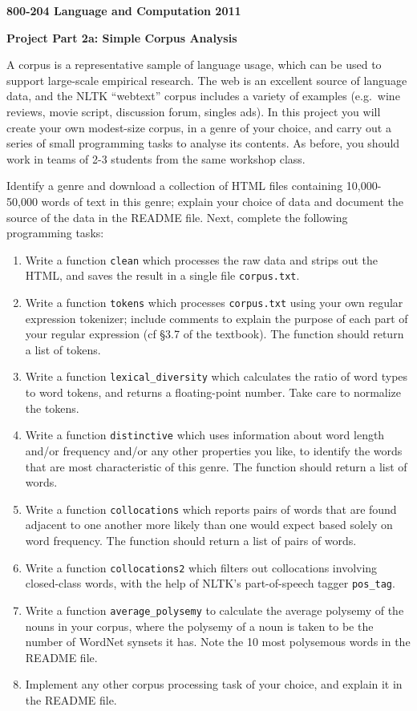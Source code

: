 \documentclass[a4paper,11pt]{article}
\begin{document}
\centerline{\LARGE\bf 800-204 Language and Computation 2011}\vspace{2ex}

\centerline{\large\bf Project Part 2a: Simple Corpus Analysis}\vspace{1ex}

A corpus is a representative sample of language usage, which can be
used to support large-scale empirical research.  The web is an
excellent source of language data, and the NLTK ``webtext'' corpus
includes a variety of examples (e.g.\ wine reviews, movie script,
discussion forum, singles ads).
In this project you
will create your own modest-size corpus, in a genre of your choice,
and carry out a
series of small programming tasks to analyse its contents.
As before, you should work in teams of 2-3 students from the same
workshop class.

Identify a genre and download a collection of HTML files containing
10,000-50,000 words of text in this genre; explain your choice of
data and document the source of the data in the README file.
Next, complete the following programming tasks:

\begin{enumerate}
\item Write a function \verb|clean| which processes the raw data and
strips out the HTML, and saves the result in a single file \verb|corpus.txt|.
\item Write a function \verb|tokens| which processes \verb|corpus.txt|
using your own regular expression tokenizer; include comments to explain
the purpose of each part of your regular expression (cf \S 3.7 of the textbook).
The function should return a list of tokens.
\item Write a function \verb|lexical_diversity| which calculates the ratio
of word types to word tokens, and returns a floating-point number.  Take care
to normalize the tokens.
\item Write a function \verb|distinctive| which uses information about word
length and/or frequency and/or any other properties you like, to identify the
words that are most characteristic of this genre.  The function should return a
list of words.
\item Write a function \verb|collocations| which reports pairs of words that are
found adjacent to one another more likely than one would expect based
solely on word frequency.  The function should return a list of pairs of words.
\item Write a function \verb|collocations2| which
filters out collocations involving closed-class words, with the help of
NLTK's part-of-speech tagger \verb|pos_tag|.
\item Write a function \verb|average_polysemy| to calculate the average polysemy
of the nouns in your corpus, where the polysemy of a noun is taken to be the number of WordNet
synsets it has.  Note the 10 most polysemous words in the README file.
\item Implement any other corpus processing task of your choice, and explain
it in the README file.
\end{enumerate}
\end{document}
